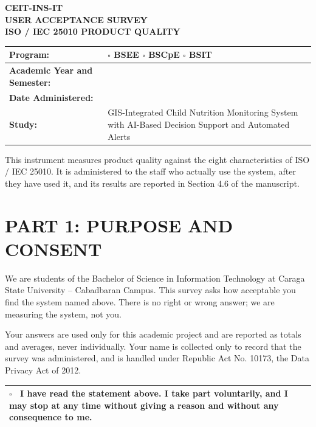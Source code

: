 \documentclass[12pt, a4paper]{report}
\begin{document}
\vspace{0.5cm}

\begin{center}
    \textbf{CEIT-INS-IT} \\
    \textbf{USER ACCEPTANCE SURVEY} \\
    \textbf{ISO / IEC 25010 PRODUCT QUALITY}
\end{center}

\vspace{0.3cm}

\begin{tabular}{|p{4cm}|p{10cm}|}
\hline
\textbf{Program:} & $\square$ BSEE \quad $\square$ BSCpE \quad $\square$ BSIT \\
\hline
\textbf{Academic Year and Semester:} & \\
\hline
\textbf{Date Administered:} & \\
\hline
\textbf{Study:} & GIS-Integrated Child Nutrition Monitoring System with AI-Based Decision Support and Automated Alerts \\
\hline
\end{tabular}

\vspace{0.3cm}
\noindent This instrument measures product quality against the eight characteristics of ISO / IEC 25010. It is administered to the staff who actually use the system, after they have used it, and its results are reported in Section 4.6 of the manuscript.

\vspace{0.5cm}

\section*{PART 1: PURPOSE AND CONSENT}
We are students of the Bachelor of Science in Information Technology at Caraga State University -- Cabadbaran Campus. This survey asks how acceptable you find the system named above. There is no right or wrong answer; we are measuring the system, not you.

Your answers are used only for this academic project and are reported as totals and averages, never individually. Your name is collected only to record that the survey was administered, and is handled under Republic Act No. 10173, the Data Privacy Act of 2012.

\vspace{0.3cm}
\begin{tabular}{|p{15cm}|}
\hline
$\square$ \ I have read the statement above. I take part voluntarily, and I may stop at any time without giving a reason and without any consequence to me. \\
\hline
\end{tabular}
\end{document}

